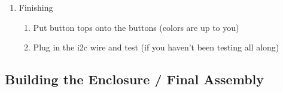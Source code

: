\documentclass[11pt]{article}
\begin{document}
\begin{enumerate}
\item Finishing
	\begin{enumerate}

	\item	Put button tops onto the buttons (colors are up to you)

	\item	Plug in the i2c wire and test 
		(if you haven't been testing all along)
	\end{enumerate}


\end{enumerate}


\subsection{Building the Enclosure / Final Assembly}
\end{document}
